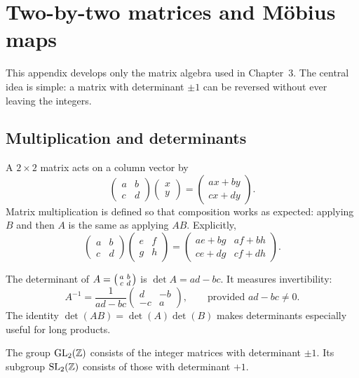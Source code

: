 \chapter{Two-by-two matrices and M\"obius maps}\label{app:matrices}

This appendix develops only the matrix algebra used in Chapter~3. The central
idea is simple: a matrix with determinant $\pm1$ can be reversed without ever
leaving the integers.

\section{Multiplication and determinants}

A $2\times2$ matrix acts on a column vector by
\[
 \begin{pmatrix}a&b\\c&d\end{pmatrix}
 \begin{pmatrix}x\\y\end{pmatrix}
 =\begin{pmatrix}ax+by\\cx+dy\end{pmatrix}.
\]
Matrix multiplication is defined so that composition works as expected:
applying $B$ and then $A$ is the same as applying $AB$. Explicitly,
\[
 \begin{pmatrix}a&b\\c&d\end{pmatrix}
 \begin{pmatrix}e&f\\g&h\end{pmatrix}
 =\begin{pmatrix}ae+bg&af+bh\\ce+dg&cf+dh\end{pmatrix}.
\]

The determinant of $A=\begin{psmallmatrix}a&b\\c&d\end{psmallmatrix}$ is
$\det A=ad-bc$. It measures invertibility:
\[
 A^{-1}=\frac1{ad-bc}
 \begin{pmatrix}d&-b\\-c&a\end{pmatrix},
 \qquad\text{provided }ad-bc\ne0.
\]
The identity $\det(AB)=\det(A)\det(B)$ makes determinants especially useful
for long products.

\begin{definition}
The group $\operatorname{GL}_2(\mathbb Z)$ consists of the integer matrices with
determinant $\pm1$. Its subgroup $\operatorname{SL}_2(\mathbb Z)$ consists of those
with determinant $+1$.
\end{definition}


